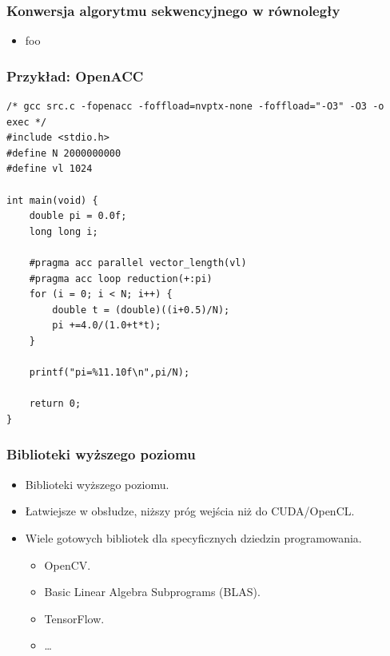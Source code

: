 \documentclass[dvipsnames,table]{beamer}
\begin{document}
\begin{frame}
	\frametitle{Konwersja algorytmu sekwencyjnego w równoległy}
\begin{itemize}
	\item foo
\end{itemize}
\end{frame}





\begin{frame}[fragile]
	\frametitle{Przykład: OpenACC}
\begin{lstlisting}
/* gcc src.c -fopenacc -foffload=nvptx-none -foffload="-O3" -O3 -o exec */
#include <stdio.h>
#define N 2000000000
#define vl 1024

int main(void) {
	double pi = 0.0f;
	long long i;

	#pragma acc parallel vector_length(vl)
	#pragma acc loop reduction(+:pi)
	for (i = 0; i < N; i++) {
		double t = (double)((i+0.5)/N);
		pi +=4.0/(1.0+t*t);
	}

	printf("pi=%11.10f\n",pi/N);

	return 0;
}
\end{lstlisting}
\end{frame}

\begin{frame}
	\frametitle{Biblioteki wyższego poziomu}
\begin{itemize}
	\item Biblioteki wyższego poziomu.
	\item Łatwiejsze w obsłudze, niższy próg wejścia niż do CUDA/OpenCL.
	\item Wiele gotowych bibliotek dla specyficznych dziedzin programowania.
	\begin{itemize}
		\item OpenCV.
		\item Basic Linear Algebra Subprograms (BLAS).
		\item TensorFlow.
		\item \ldots 
	\end{itemize}
\end{itemize}
\end{frame}
\end{document}
